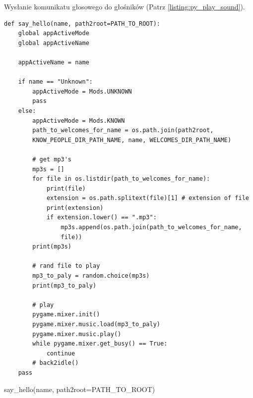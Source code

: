\documentclass[a4paper,12pt,reqno]{article}
\begin{document}
\newpage
Wysłanie komunikatu głosowego do głośników  (Patrz \ref{listing:py_play_sound}).
\begin{listing}[H]%
\begin{mdframed}[backgroundcolor=codebg]
\begin{verbatim}
def say_hello(name, path2root=PATH_TO_ROOT):
    global appActiveMode
    global appActiveName
    
    appActiveName = name
    
    if name == "Unknown":
        appActiveMode = Mods.UNKNOWN
        pass
    else:
        appActiveMode = Mods.KNOWN
        path_to_welcomes_for_name = os.path.join(path2root,
        KNOW_PEOPLE_DIR_PATH_NAME, name, WELCOMES_DIR_PATH_NAME)
        
        # get mp3's
        mp3s = []
        for file in os.listdir(path_to_welcomes_for_name):
            print(file)
            extension = os.path.splitext(file)[1] # extension of file
            print(extension)
            if extension.lower() == ".mp3":
                mp3s.append(os.path.join(path_to_welcomes_for_name, 
                file))
        print(mp3s)        
        
        # rand file to play
        mp3_to_paly = random.choice(mp3s)
        print(mp3_to_paly)
        
        # play      
        pygame.mixer.init()
        pygame.mixer.music.load(mp3_to_paly)
        pygame.mixer.music.play()
        while pygame.mixer.get_busy() == True:
            continue
        # back2idle()
    pass
\end{verbatim}
\end{mdframed}
\caption{say\_hello(name, path2root=PATH\_TO\_ROOT)}
\label{listing:py_play_sound}
\end{listing}
\end{document}
